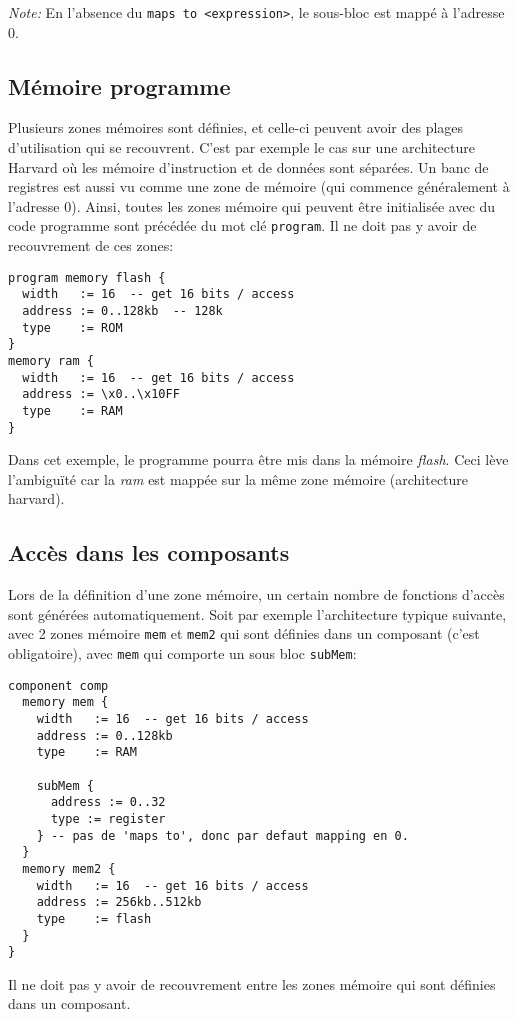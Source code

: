 \emph{Note:} En l'absence du \texttt{maps to <expression>}, le sous-bloc est mappé à l'adresse 0.
\subsection{Mémoire programme}
\label{sec:memProgramme}
Plusieurs zones mémoires sont définies, et celle-ci peuvent avoir des plages d'utilisation qui se recouvrent. C'est par exemple le cas sur une architecture Harvard où les mémoire d'instruction et de données sont séparées. Un banc de registres est aussi vu comme une zone de mémoire (qui commence généralement à l'adresse 0).
Ainsi, toutes les zones mémoire qui peuvent être initialisée avec du code programme sont précédée du mot clé \texttt{program}. Il ne doit pas y avoir de recouvrement de ces zones:

\begin{lstlisting}
program memory flash {
  width   := 16  -- get 16 bits / access
  address := 0..128kb  -- 128k
  type    := ROM
}
memory ram {
  width   := 16  -- get 16 bits / access
  address := \x0..\x10FF 
  type    := RAM 
}  
\end{lstlisting}
Dans cet exemple, le programme pourra être mis dans la mémoire \emph{flash}. Ceci lève l'ambiguïté car la \emph{ram} est mappée sur la même zone mémoire (architecture harvard).

\subsection{Accès dans les composants}
Lors de la définition d'une zone mémoire, un certain nombre de fonctions d'accès sont générées automatiquement. Soit par exemple l'architecture typique suivante, avec 2 zones mémoire \texttt{mem} et \texttt{mem2} qui sont définies dans un composant (c'est obligatoire), avec \texttt{mem} qui comporte un sous bloc \texttt{subMem}:
\begin{lstlisting}
component comp
  memory mem {
    width   := 16  -- get 16 bits / access
    address := 0..128kb  
    type    := RAM
    
    subMem {
      address := 0..32
      type := register
    } -- pas de 'maps to', donc par defaut mapping en 0.
  }
  memory mem2 {
    width   := 16  -- get 16 bits / access
    address := 256kb..512kb  
    type    := flash
  }
}
\end{lstlisting}
Il ne doit pas y avoir de recouvrement entre les zones mémoire qui sont définies dans un composant.

